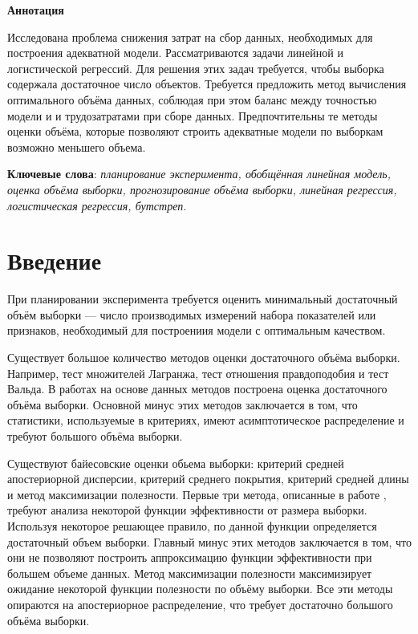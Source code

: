 \documentclass[12pt, a4paper]{scrartcl}
\theoremstyle{plain}
\theoremstyle{definition}
\begin{document}
\large\tableofcontents %
\newpage

\begin{center}
\textbf{Аннотация}
\end{center}

Исследована проблема снижения затрат на сбор данных, необходимых для построения
адекватной модели. Рассматриваются задачи линейной и логистической регрессий. Для решения этих задач требуется, чтобы выборка содержала достаточное число  объектов. Требуется предложить метод вычисления оптимального объёма данных, соблюдая при этом баланс между точностью модели и и трудозатратами при сборе данных. Предпочтительны те методы оценки объёма, которые позволяют строить адекватные модели по выборкам возможно меньшего объема.

\bigskip

\textbf{Ключевые слова}: \emph {планирование эксперимента, обобщённая линейная модель, оценка объёма выборки, прогнозирование объёма выборки, линейная регрессия, логистическая регрессия, бутстреп}.

\newpage

\section{Введение}
При планировании эксперимента требуется оценить минимальный  достаточный объём выборки --- число производимых измерений набора показателей или признаков, необходимый для построениия модели с оптимальным качеством. 

Существует большое количество методов оценки достаточного объёма выборки. Например, тест множителей Лагранжа, тест отношения правдоподобия и тест Вальда. В работах \cite{Self-Mauritsen-1998, Shieh-2000, Shieh-2005} на основе данных методов построена оценка достаточного объёма выборки. Основной минус этих методов заключается в том, что статистики, используемые в критериях, имеют асимптотическое распределение и требуют большого объёма выборки.

Существуют байесовские оценки обьема выборки: критерий средней апостериорной дисперсии, критерий среднего покрытия, критерий средней длины и метод максимизации полезности. Первые три метода, описанные в работе \cite{Wang-Gelfand-2002}, требуют анализа некоторой функции эффективности от размера выборки. Используя некоторое решающее правило, по данной функции определяется достаточный объем выборки. Главный минус этих методов заключается в том, что они не позволяют построить аппроксимацию функции эффективности при большем объеме данных. Метод максимизации полезности максимизирует ожидание некоторой функции полезности по объёму выборки. Все эти методы опираются на апостериорное распределение, что требует достаточно большого объёма выборки.
\end{document}
